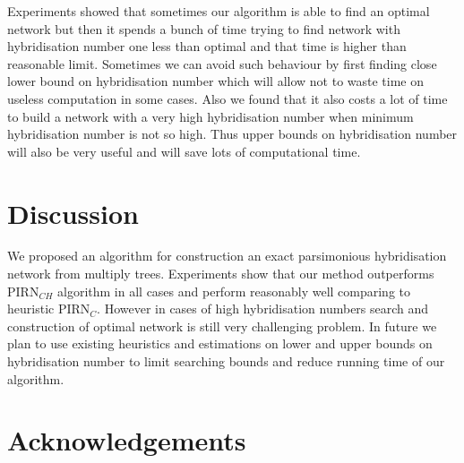 \documentclass[runningheads, envcountsame, a4paper]{llncs}
\begin{document}
Experiments showed that sometimes our algorithm is able to find an optimal network but then it spends a bunch of time trying to find network 
with hybridisation number one less than optimal and that time is higher than reasonable limit. Sometimes we can avoid such behaviour by 
first finding close lower bound on hybridisation number which will allow not to waste time on useless computation in some cases. Also we found 
that it also costs a lot of time to build a network with a very high hybridisation number when minimum hybridisation number is not so high. 
Thus upper bounds on hybridisation number will also be very useful and will save lots of computational time.

\section{Discussion}

We proposed an algorithm for construction an exact parsimonious hybridisation network from multiply trees. Experiments show that our method 
outperforms PIRN$_{CH}$ algorithm in all cases and perform reasonably well comparing to heuristic PIRN$_C$. However in cases of high 
hybridisation numbers search and construction of optimal network  is still very challenging problem. In future we plan to use existing 
heuristics and estimations on lower and upper bounds on hybridisation number to limit searching bounds and reduce running time of our algorithm.

\section*{Acknowledgements}



\clearpage
\end{document}
